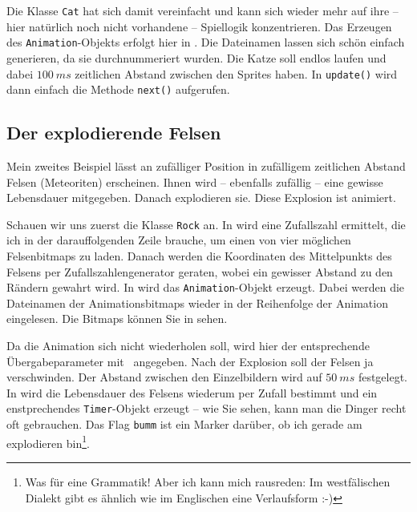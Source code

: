 Die Klasse \texttt{Cat} hat sich damit vereinfacht und kann sich wieder mehr auf ihre -- hier natürlich noch nicht vorhandene -- Spiellogik konzentrieren. Das Erzeugen des \texttt{Animation}-Objekts erfolgt hier in . Die Dateinamen lassen sich schön einfach generieren, da sie durchnummeriert wurden. Die Katze soll endlos laufen und dabei $100~ms$ zeitlichen Abstand zwischen den Sprites haben. In \texttt{update()} wird dann einfach die Methode \texttt{next()} aufgerufen.

\newpage
{} 

\subsection{Der explodierende Felsen}

Mein zweites Beispiel lässt an zufälliger Position in zufälligem zeitlichen Abstand Felsen (Meteoriten) erscheinen. Ihnen wird -- ebenfalls zufällig -- eine gewisse Lebensdauer mitgegeben. Danach explodieren sie. Diese Explosion ist animiert. 

Schauen wir uns zuerst die Klasse \texttt{Rock} an. In  wird eine Zufallszahl ermittelt, die ich in der darauffolgenden Zeile brauche, um einen von vier möglichen Felsenbitmaps zu laden. Danach werden die Koordinaten des Mittelpunkts des Felsens per Zufallszahlengenerator geraten, wobei ein gewisser Abstand zu den Rändern gewahrt wird. In  wird das \texttt{Animation}-Objekt erzeugt. Dabei werden die Dateinamen der Animationsbitmaps wieder in der Reihenfolge der Animation eingelesen. Die Bitmaps können Sie in  sehen. 

Da die Animation sich nicht wiederholen soll, wird hier der entsprechende Übergabeparameter mit \false\ angegeben. Nach der Explosion soll der Felsen ja verschwinden. Der Abstand zwischen den Einzelbildern wird auf $50~ms$ festgelegt. In  wird die Lebensdauer des Felsens wiederum per Zufall bestimmt und ein enstprechendes \texttt{Timer}-Objekt erzeugt -- wie Sie sehen, kann man die Dinger recht oft gebrauchen. Das Flag \texttt{bumm} ist ein Marker darüber, ob ich gerade am explodieren bin\footnote{Was für eine Grammatik! Aber ich kann mich rausreden: Im westfälischen Dialekt gibt es ähnlich wie im Englischen eine Verlaufsform :-)}. 

